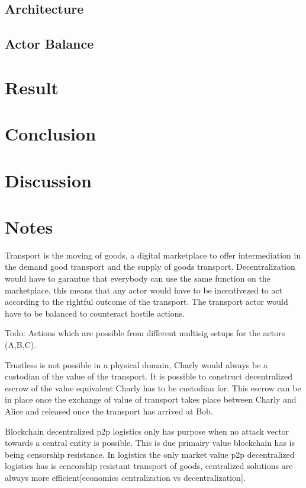 \documentclass[Nomencl]{SelimArticle}
\begin{document}
\subsection{Architecture}

\subsection{Actor Balance}


\section{Result}

\section{Conclusion}

\section{Discussion}

\section{Notes}

Transport is the moving of goods, a digital marketplace to offer intermediation in the demand good transport and the supply of goods transport. Decentralization would have to garantue that everybody can use the same function on the marketplace, this means that any actor would have to be incentivezed to act according to the rightful outcome of the transport. The transport actor would have to be balanced to counteract hostile actions.

Todo: Actions which are possible from different multisig setups for the actors (A,B,C).

Trustless is not possible in a physical domain, Charly would always be a custodian of the value of the transport. It is possible to construct decentralized escrow of the value equivalent Charly has to be custodian for. This escrow can be in place once the exchange of value of transport takes place between Charly and Alice and released once the transport has arrived at Bob.

Blockchain decentralized p2p logistics only has purpose when no attack vector towards a central entity is possible. This is due primairy value blockchain has is being censorship resistance. In logistics the only market value p2p decentralized logistics has is cencorship resistant transport of goods, centralized solutions are always more efficient[economics centralization vs decentralization].
\end{document}
